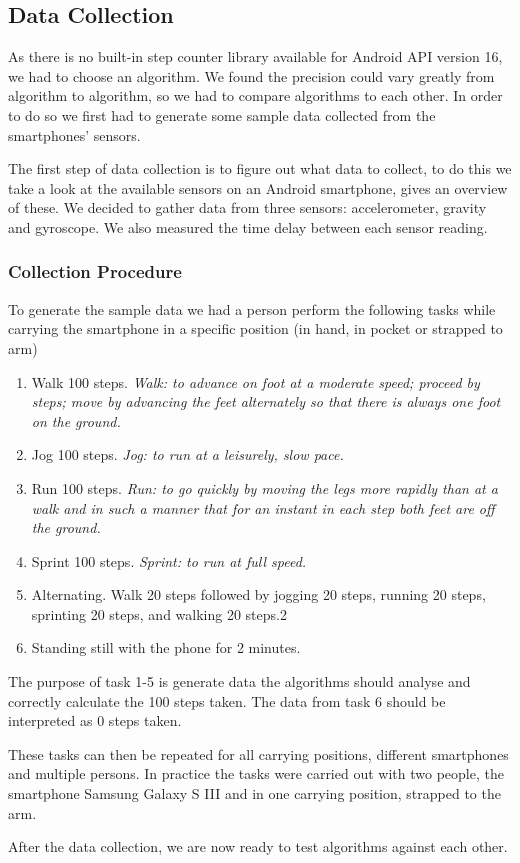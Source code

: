 \subsection{Data Collection}
As there is no built-in step counter library available for Android API version 16, we had to choose an algorithm. We found the precision could vary greatly from algorithm to algorithm, so we had to compare algorithms to each other. In order to do so we first had to generate some sample data collected from the smartphones' sensors. 

The first step of data collection is to figure out what data to collect, to do this we take a look at the available sensors on an Android smartphone, \citet{android:sensor} gives an overview of these. We decided to gather data from three sensors: accelerometer, gravity and gyroscope. We also measured the time delay between each sensor reading.

\subsubsection{Collection Procedure}
To generate the sample data we had a person perform the following tasks while carrying the smartphone in a specific position (in hand, in pocket or strapped to arm)
\begin{enumerate}
\item Walk 100 steps. \textit{Walk: to advance on foot at a moderate speed; proceed by steps; move by advancing the feet alternately so that there is always one foot on the ground.} %
\item Jog 100 steps. \textit{Jog: to run at a leisurely, slow pace.} %
\item Run 100 steps. \textit{Run: to go quickly by moving the legs more rapidly than at a walk and in such a manner that for an instant in each step both feet are off the ground.} %
\item Sprint 100 steps. \textit{Sprint: to run at full speed.} %
\item Alternating. Walk 20 steps followed by jogging 20 steps, running 20 steps, sprinting 20 steps, and walking 20 steps.2
\item Standing still with the phone for 2 minutes.
\end{enumerate}

The purpose of task 1-5 is generate data the algorithms should analyse and correctly calculate the 100 steps taken. The data from task 6 should be interpreted as 0 steps taken.

These tasks can then be repeated for all carrying positions, different smartphones and multiple persons. In practice the tasks were carried out with two people, the smartphone Samsung Galaxy S III and in one carrying position, strapped to the arm.

After the data collection, we are now ready to test algorithms against each other.